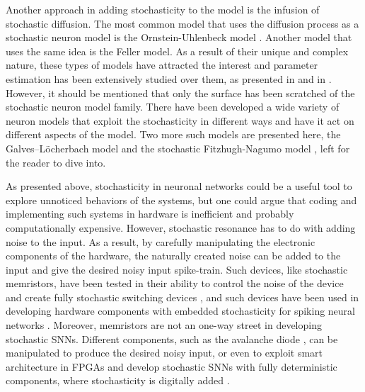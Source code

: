 \documentclass[12pt]{report}
\begin{document}
Another approach in adding stochasticity to the model is the infusion of stochastic diffusion. The most common model that uses the diffusion process as a stochastic neuron model is the Ornstein-Uhlenbeck model \cite{Lansky1995}. Another model that uses the same idea is the Feller model. As a result of their unique and complex nature, these types of models have attracted the interest and parameter estimation has been extensively studied over them, as presented in \cite{Ditlevsen2006} and in \cite{Lansky2008}. However, it should be mentioned that only the surface has been scratched of the stochastic neuron model family. There have been developed a wide variety of neuron models that exploit the stochasticity in different ways and have it act on different aspects of the model. Two more such models are presented here, the Galves–Löcherbach model \cite{Galves2013} and the stochastic Fitzhugh-Nagumo model \cite{Tuckwell1998}, left for the reader to dive into.

As presented above, stochasticity in neuronal networks could be a useful tool to explore unnoticed behaviors of the systems, but one could argue that coding and implementing such systems in hardware is inefficient and probably computationally expensive. However, stochastic resonance has to do with adding noise to the input. As a result, by carefully manipulating the electronic components of the hardware, the naturally created noise can be added to the input and give the desired noisy input spike-train. Such devices, like stochastic memristors, have been tested in their ability to control the noise of the device and create fully stochastic switching devices \cite{Gaba2013}, and such devices have been used in developing hardware components with embedded stochasticity for spiking neural networks \cite{Maruan2015}. Moreover, memristors are not an one-way street in developing stochastic SNNs. Different components, such as the avalanche diode \cite{Clayton2011}, can be manipulated to produce the desired noisy input, or even to exploit smart architecture in FPGAs and develop stochastic SNNs with fully deterministic components, where stochasticity is digitally added \cite{Josep2012}. 
\end{document}
